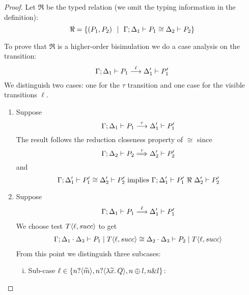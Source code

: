 \begin{proof}
	\noi Let $\Re$ be the typed relation (we omit the typing information in the definition):
	\[
		\Re = \{(P_1, P_2) \ \ |\ \  \Gamma; \Delta_1 \vdash P_1 \cong \Delta_2 \vdash P_2\}
	\]

	To prove that $\Re$ is a higher-order bisimulation
	we do a case analysis on the transition:
	\[
		\Gamma; \Delta_1 \vdash P_1 \stackrel{\ell}{\longrightarrow} \Delta_1' \vdash P_1'
	\]
	We distinguish two cases: one for the $\tau$ transition and one case for
	the visible transitions $\ell$.

\begin{enumerate}
	\item Suppose 
			\[
				\Gamma; \Delta_1 \vdash P_1 \stackrel{\tau}{\longrightarrow} \Delta_1' \vdash P_1'
			\]
			\noi The result follows the reduction closeness property of $\cong$ since
			\[
				\Gamma; \Delta_2 \vdash P_2 \stackrel{\tau}{\Longrightarrow} \Delta_2' \vdash P_2'
			\]
			\noi and
			\[
				\horel{\Gamma}{\Delta_1'}{P_1'}{\cong}{\Delta_2'}{P_2'} \text{ implies } \horel{\Gamma}{\Delta_1'}{P_1'}{\ \Re\ }{\Delta_2'}{P_2'}
			\]

	\item Suppose
			\begin{eqnarray}
				\Gamma; \Delta_1 \vdash P_1 \stackrel{\ell}{\longrightarrow} \Delta_1' \vdash P_1'
				\label{lem:cong_is_wb1}
			\end{eqnarray}
			\noi We choose test $T\langle \ell, succ \rangle$ to get
			\begin{eqnarray}
				\Gamma; \Delta_1 \cdot \Delta_3 \vdash P_1 \;|\; T\langle \ell, succ \rangle \cong \Delta_2 \cdot \Delta_3 \vdash P_2 \;|\; T\langle \ell, succ \rangle
				\label{lem:cong_is_wb2}
			\end{eqnarray}
			\noi From this point we distinguish three subcases:

			\begin{enumerate}[i.]
				\item	Sub-case $\ell \in \{n ? \langle \widetilde{m} \rangle, n ? \langle \lambda \widetilde{x}.\,Q \rangle, n \oplus l, n \& l\}$:


\end{enumerate}
\end{enumerate}
\end{proof}
